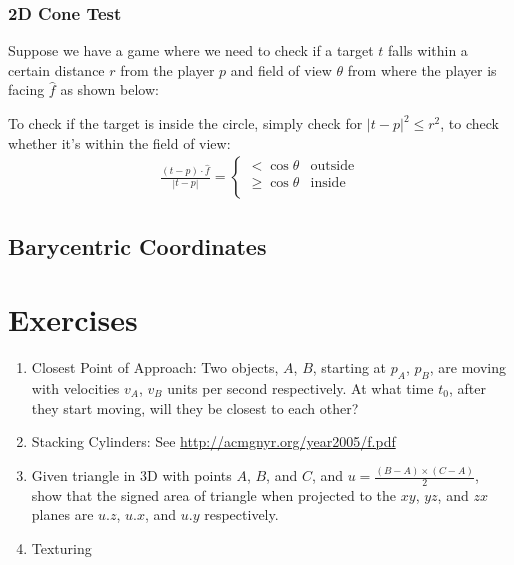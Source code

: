 \documentclass[12pt]{report}
\newcommand\pgfmathsinandcos[3]{%
  \pgfmathsetmacro#1{sin(#3)}%
  \pgfmathsetmacro#2{cos(#3)}%
}
\begin{document}
	\subsubsection{2D Cone Test}
	Suppose we have a game where we need to check if a target $t$ falls within a certain distance $r$ from the player $p$ and field of view $\theta$ from where the player is facing $\hat{f}$ as shown below:
	\begin{center}
	\end{center}
	To check if the target is inside the circle, simply check for $|t - p|^2 \leq r^2$, to check whether it's within the field of view:
	\begin{align}
	\frac{(t - p) \cdot \hat{f}}{|t - p|} = \begin{cases}
	< \cos\theta & \text{outside}\\
	\geq \cos\theta & \text{inside} \\
	\end{cases}
	\end{align}
\subsection{Barycentric Coordinates}
\section{Exercises}
	\begin{enumerate}
		\item Closest Point of Approach: Two objects, $A$, $B$, starting at $p_A$, $p_B$, are moving with velocities $v_A$, $v_B$ units per second respectively. At what time $t_0$, after they start moving, will they be closest to each other?
		\item Stacking Cylinders: See \url{http://acmgnyr.org/year2005/f.pdf}
		\item Given triangle in 3D with points $A$, $B$, and $C$, and $u = \frac{(B - A)\times (C - A)}{2}$, show that the signed area of triangle when projected to the $xy$, $yz$, and $zx$ planes are $u.z$, $u.x$, and $u.y$ respectively.
		\item Texturing
	\end{enumerate}
\end{document}
